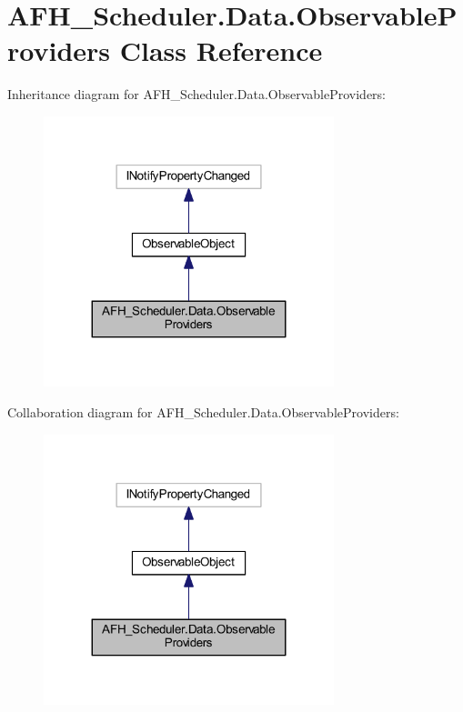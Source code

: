\section{A\+F\+H\+\_\+\+Scheduler.\+Data.\+Observable\+Providers Class Reference}
\label{class_a_f_h___scheduler_1_1_data_1_1_observable_providers}


Inheritance diagram for A\+F\+H\+\_\+\+Scheduler.\+Data.\+Observable\+Providers\+:
\nopagebreak
\begin{figure}[H]
\begin{center}
\leavevmode
\includegraphics[width=239pt]{class_a_f_h___scheduler_1_1_data_1_1_observable_providers__inherit__graph}
\end{center}
\end{figure}


Collaboration diagram for A\+F\+H\+\_\+\+Scheduler.\+Data.\+Observable\+Providers\+:
\nopagebreak
\begin{figure}[H]
\begin{center}
\leavevmode
\includegraphics[width=239pt]{class_a_f_h___scheduler_1_1_data_1_1_observable_providers__coll__graph}
\end{center}
\end{figure}
